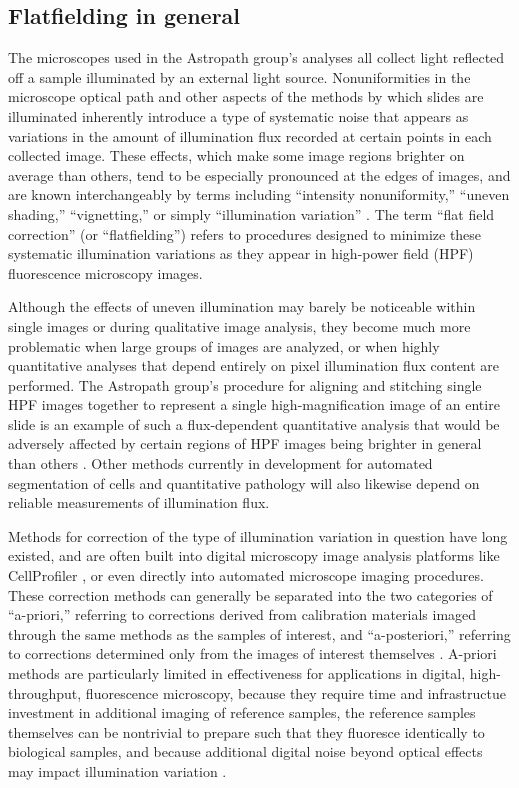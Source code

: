 \documentclass[letterpaper,11pt]{article}
\begin{document}
\subsection{Flatfielding in general}
\label{ssec:flatfielding_in_general}

The microscopes used in the Astropath group's analyses all collect light reflected off a sample illuminated by an external light source. Nonuniformities in the microscope optical path and other aspects of the methods by which slides are illuminated inherently introduce a type of systematic noise that appears as variations in the amount of illumination flux recorded at certain points in each collected image. These effects, which make some image regions brighter on average than others, tend to be especially pronounced at the edges of images, and are known interchangeably by terms including ``intensity nonuniformity,'' ``uneven shading,'' ``vignetting,'' or simply ``illumination variation'' \cite{doi:10.1111/jmi.12178}. The term ``flat field correction'' (or ``flatfielding'') refers to procedures designed to minimize these systematic illumination variations as they appear in high-power field (HPF) fluorescence microscopy images. 

Although the effects of uneven illumination may barely be noticeable within single images or during qualitative image analysis, they become much more problematic when large groups of images are analyzed, or when highly quantitative analyses that depend entirely on pixel illumination flux content are performed. The Astropath group's procedure for aligning and stitching single HPF images together to represent a single high-magnification image of an entire slide is an example of such a flux-dependent quantitative analysis that would be adversely affected by certain regions of HPF images being brighter in general than others \cite{Heshy}. Other methods currently in development for automated segmentation of cells and quantitative pathology will also likewise depend on reliable measurements of illumination flux.

Methods for correction of the type of illumination variation in question have long existed, and are often built into digital microscopy image analysis platforms like CellProfiler \cite{Carpenter2006}, or even directly into automated microscope imaging procedures. These correction methods can generally be separated into the two categories of ``a-priori,'' referring to corrections derived from calibration materials imaged through the same methods as the samples of interest, and ``a-posteriori,'' referring to corrections determined only from the images of interest themselves \cite{18770694}. A-priori methods are particularly limited in effectiveness for applications in digital, high-throughput, fluorescence microscopy, because they require time and infrastructue investment in additional imaging of reference samples, the reference samples themselves can be nontrivial to prepare such that they fluoresce identically to biological samples, and because additional digital noise beyond optical effects may impact illumination variation \cite{doi:10.1111/jmi.12178}.
\end{document}
